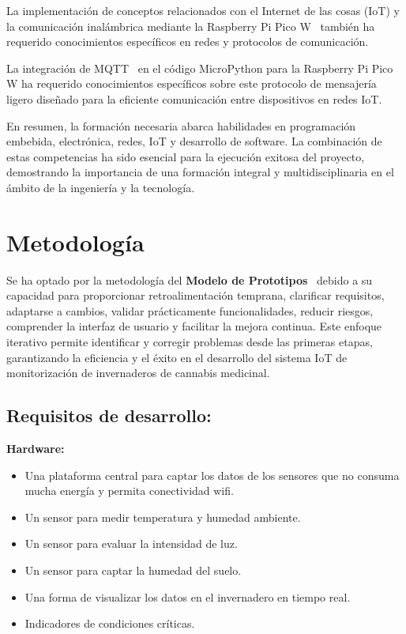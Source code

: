 La implementación de conceptos relacionados con el Internet de las cosas (IoT) y la comunicación inalámbrica mediante la Raspberry Pi Pico W~\cite{misc:RPiPicoW} también ha requerido conocimientos específicos en redes y protocolos de comunicación.

La integración de MQTT~\cite{manual:MQTT} en el código MicroPython para la Raspberry Pi Pico W ha requerido conocimientos específicos sobre este protocolo de mensajería ligero diseñado para la eficiente comunicación entre dispositivos en redes IoT.

En resumen, la formación necesaria abarca habilidades en programación embebida, electrónica, redes, IoT y desarrollo de software. La combinación de estas competencias ha sido esencial para la ejecución exitosa del proyecto, demostrando la importancia de una formación integral y multidisciplinaria en el ámbito de la ingeniería y la tecnología.

\section{Metodología}
Se ha optado por la metodología del \textbf{Modelo de Prototipos}~\cite{misc:Metodologia_ModeloDePrototipos} debido a su capacidad para proporcionar retroalimentación temprana, clarificar requisitos, adaptarse a cambios, validar prácticamente funcionalidades, reducir riesgos, comprender la interfaz de usuario y facilitar la mejora continua. Este enfoque iterativo permite identificar y corregir problemas desde las primeras etapas, garantizando la eficiencia y el éxito en el desarrollo del sistema IoT de monitorización de invernaderos de cannabis medicinal.

\subsection{Requisitos de desarrollo:}
\textbf{Hardware:}
\begin{itemize}
	\item Una plataforma central para captar los datos de los sensores que no consuma mucha energía y permita conectividad wifi.
	\item Un sensor para medir temperatura y humedad ambiente.
	\item Un sensor para evaluar la intensidad de luz.
	\item Un sensor para captar la humedad del suelo.
	\item Una forma de visualizar los datos en el invernadero en tiempo real.
	\item Indicadores de condiciones críticas.
\end{itemize}

